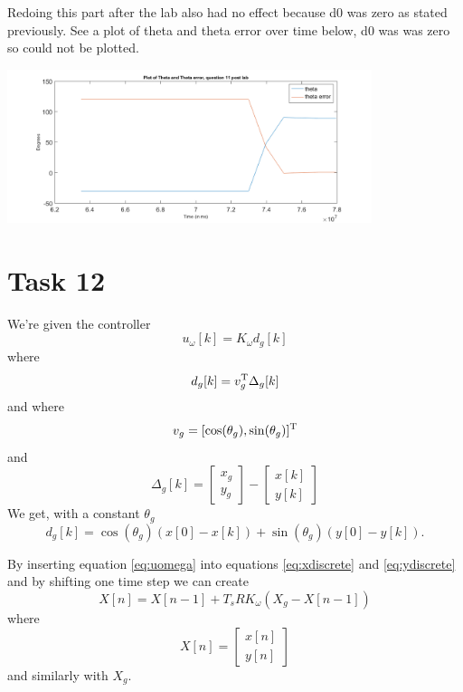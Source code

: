 \documentclass[a4paper,12pt,oneside,onecolumn]{article} %
\begin{document}
Redoing this part after the lab also had no effect because d0 was zero as stated previously. See a plot of theta and theta error over time below, d0 was was zero so could not be plotted.\\
  \begin{center}
  \includegraphics[width = 0.8\textwidth]{q11b}
 \end{center}
 

\section*{Task 12}
We're given the controller 
\begin{equation}\label{eq:uomega}
u_\omega [k] = K_\omega d_g [k]
\end{equation}
where
\begin{equation}
d_g [k] = v_g^{\rm T} \Delta_g[k]
\end{equation}
and where
\begin{equation}
v_g = [\cos(\theta_g), \sin(\theta_g)]^{\rm T}
\end{equation}
and
\begin{equation}
\Delta_g[k] =
\begin{bmatrix}
x_g \\ y_g
\end{bmatrix}
-
\begin{bmatrix}
x[k] \\ y[k]
\end{bmatrix}
\end{equation}
We get, with a constant $\theta_g$
\begin{equation}
d_g[k] = \cos(\theta_g)(x[0] - x[k]) + \sin(\theta_g)(y[0] - y[k]).
\end{equation}

By inserting equation \eqref{eq:uomega} into equations \eqref{eq:xdiscrete} and \eqref{eq:ydiscrete} and by shifting one time step we can create
\begin{equation}
X[n] = X[n-1] + T_s R K_\omega \left( X_g - X[n-1] \right)
\end{equation}
where
\begin{equation}
X[n] = 
\begin{bmatrix}
x[n] \\ y[n]
\end{bmatrix}
\end{equation}	
and similarly with $X_g$.
\end{document}
